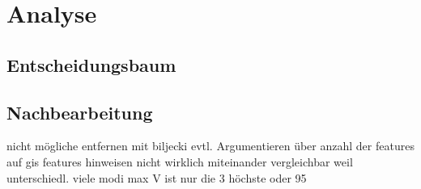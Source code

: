 \chapter{Analyse}

\pagebreak
\section{Entscheidungsbaum}
\section{Nachbearbeitung}

nicht mögliche entfernen 
mit biljecki evtl. Argumentieren über anzahl der features
auf gis features hinweisen
nicht wirklich miteinander vergleichbar weil unterschiedl. viele modi
max V ist nur die 3 höchste oder 95%
